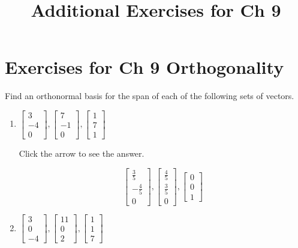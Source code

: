 \documentclass{ximera}
\title{Additional Exercises for Ch 9} \license{CC BY-NC-SA 4.0}
\begin{document}
\begin{abstract}
\end{abstract}
\maketitle

\section*{Exercises for Ch 9 Orthogonality}

\begin{problem}\label{prob:find_ortho_basis_span}

Find an orthonormal basis for the span of each of the following sets of
vectors.

\begin{enumerate}
\item $\left[
\begin{array}{r}
 3 \\
-4 \\
0
\end{array}
\right] ,\left[
\begin{array}{r}
 7 \\
-1 \\
0
\end{array}
\right] ,\left[
\begin{array}{r}
 1 \\
7 \\
1
\end{array}
\right] $

Click the arrow to see the answer.
\begin{expandable}
\[
\left[
\begin{array}{c}
\frac{3}{5} \\
-\frac{4}{5} \\
0
\end{array}
\right] ,\left[
\begin{array}{c}
\frac{4}{5} \\
\frac{3}{5} \\
0
\end{array}
\right] ,\left[
\begin{array}{c}
0 \\
0 \\
1
\end{array}
\right]
\]
\end{expandable}

\item $\left[
\begin{array}{r}
3 \\
0 \\
-4
\end{array}
\right] ,\left[
\begin{array}{r}
 11 \\
0 \\
2
\end{array}
\right] ,\left[
\begin{array}{r}
1 \\
1 \\
7
\end{array}
\right] $


\end{enumerate}
\end{problem}
\end{document}
